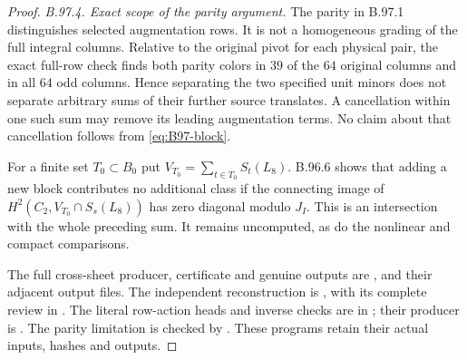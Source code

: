 \begin{proof}
\emph{B.97.4. Exact scope of the parity argument.}
The parity in B.97.1 distinguishes selected augmentation rows.
It is not a homogeneous grading of the full integral columns.
Relative to the original pivot for each physical pair, the exact
full-row check finds both parity colors in $39$ of the $64$
original columns and in all $64$ odd columns.  Hence separating
the two specified unit minors does not separate arbitrary sums
of their further source translates.  A cancellation within one
such sum may remove its leading augmentation terms.  No claim
about that cancellation follows from \eqref{eq:B97-block}.

For a finite set $T_0\subset B_0$ put
$V_{T_0}=\sum_{t\in T_0}S_t(L_8)$.  B.96.6 shows that adding a
new block contributes no additional class if the connecting image
of $H^2(C_2,V_{T_0}\cap S_s(L_8))$ has zero diagonal modulo
$J_I$.  This is an intersection with the whole preceding sum.
It remains uncomputed, as do the nonlinear and compact comparisons.

\begingroup\raggedright
The full cross-sheet producer, certificate and genuine outputs are
,
 and their
adjacent output files.  The independent reconstruction is
,
with its complete review in
.
The literal row-action heads and inverse checks are in
; their producer is
.
The parity limitation is checked by
.
These programs retain their actual inputs, hashes and outputs.\par
\endgroup
\end{proof}
